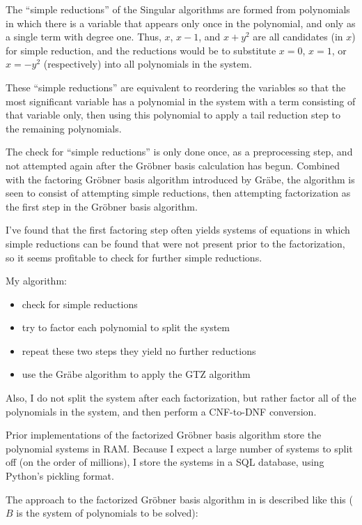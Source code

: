 \documentclass{article}
\begin{document}
The ``simple reductions'' of the Singular algorithms are formed from polynomials in which
there is a variable that appears only once in the polynomial, and only as a single term with degree one.
Thus, $x$, $x-1$, and $x+y^2$ are all candidates (in $x$) for simple reduction, and
the reductions would be to substitute $x=0$, $x=1$, or $x=-y^2$ (respectively) into all
polynomials in the system.

These ``simple reductions'' are equivalent to reordering the variables
so that the most significant variable has a polynomial in
the system with a term consisting of that variable only,
then using this polynomial to apply a tail reduction step to the remaining polynomials.

The check for ``simple reductions'' is only done once, as a preprocessing step,
and not attempted again after the Gr\"obner basis calculation has begun.
Combined with the factoring Gr\"obner basis algorithm introduced by Gr\"abe,
the algorithm is seen to consist of attempting simple reductions, then
attempting factorization as the first step in the Gr\"obner basis algorithm.

I've found that the first factoring step often yields systems of equations in
which simple reductions can be found that were not present prior to
the factorization, so it seems profitable to check for further simple reductions.

My algorithm:

\begin{itemize}
\item check for simple reductions
\item try to factor each polynomial to split the system
\item repeat these two steps they yield no further reductions
\item use the Gr\"abe algorithm to apply the GTZ algorithm
\end{itemize}

Also, I do not split the system after each factorization, but rather factor
all of the polynomials in the system, and then perform a CNF-to-DNF conversion.

Prior implementations of the factorized Gr\"obner basis algorithm
store the polynomial systems in RAM.  Because I expect a large number
of systems to split off (on the order of millions), I store the
systems in a SQL database, using Python's pickling format.

The approach to the factorized Gr\"obner basis algorithm in \cite{Grabe06}
is described like this ($B$ is the system of polynomials to be solved):
\end{document}
